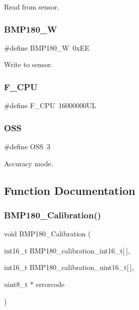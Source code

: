 Read from sensor. 

\mbox{\label{bmp180__lib_8h_ac480e84c66767fe1397b5c8dccf7b36d}} 
\subsubsection{B\+M\+P180\+\_\+W}
{\footnotesize\ttfamily \#define B\+M\+P180\+\_\+W~0x\+EE}



Write to sensor. 

\mbox{\label{bmp180__lib_8h_a43bafb28b29491ec7f871319b5a3b2f8}} 
\subsubsection{F\+\_\+\+C\+PU}
{\footnotesize\ttfamily \#define F\+\_\+\+C\+PU~16000000\+UL}

\mbox{\label{bmp180__lib_8h_a787dcec9c06363bc7354929f79ec6440}} 
\subsubsection{O\+SS}
{\footnotesize\ttfamily \#define O\+SS~3}



Accuracy mode. 



\subsection{Function Documentation}
\mbox{\label{bmp180__lib_8h_ad96ebd71d1c58702c149e8b0a9c1579c}} 
\subsubsection{B\+M\+P180\+\_\+\+Calibration()}
{\footnotesize\ttfamily void B\+M\+P180\+\_\+\+Calibration (\begin{DoxyParamCaption}\item[{int16\+\_\+t}]{B\+M\+P180\+\_\+calibration\+\_\+int16\+\_\+t[$\,$],  }\item[{int16\+\_\+t}]{B\+M\+P180\+\_\+calibration\+\_\+uint16\+\_\+t[$\,$],  }\item[{uint8\+\_\+t $\ast$}]{errorcode }\end{DoxyParamCaption})}



